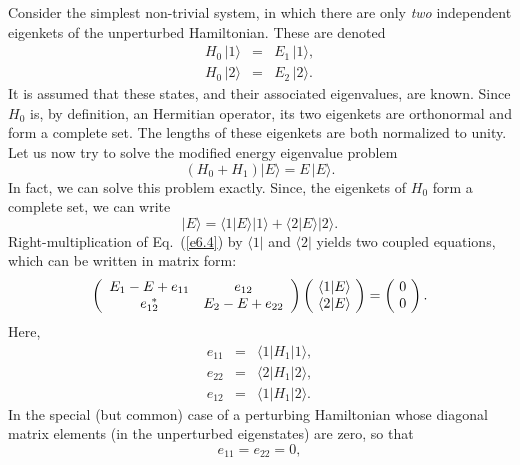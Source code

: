 Consider the simplest non-trivial system, in which there are only {\em two}
independent  eigenkets of the unperturbed Hamiltonian. These are denoted
\begin{eqnarray}
H_0 \,|1\rangle &=& E_1 \,|1\rangle,\\[0.5ex]
H_0 \,|2\rangle &=& E_2 \,|2\rangle.
\end{eqnarray}
It is assumed that these states, and their associated eigenvalues, are known.
Since $H_0$ is, by definition,  an Hermitian operator,
 its two eigenkets are orthonormal
and form a complete set. The lengths of these
eigenkets are both normalized to unity. 
Let us now try to solve the modified energy eigenvalue problem
\begin{equation}\label{e6.4}
(H_0 + H_1) |E\rangle = E\,|E\rangle.
\end{equation}
In fact, we can solve this problem exactly. Since, the eigenkets of $H_0$ form a
complete set, we can write
\begin{equation}
|E\rangle = \langle 1|E\rangle |1\rangle  + \langle 2|E\rangle |2\rangle.
\end{equation}
Right-multiplication of  Eq.~(\ref{e6.4}) by $\langle 1|$ and $\langle 2|$ yields two
coupled equations, which can be written in matrix form:
\begin{equation}\label{e6.6}
\left( \begin{array}{c c}
E_1 -E + e_{11}   & e_{12} \\
e_{12}^{~\ast} & E_2 -E + e_{22} 
\end{array} \right)\left(\!
\begin{array}{c}\langle 1|E\rangle\\
\langle 2|E \rangle\end{array}
\!\right)= \left(\!\begin{array}{c}0\\
0 \end{array}\!
\right).
\end{equation}
Here,
\begin{eqnarray}
e_{11} &=& \langle 1|H_1 | 1\rangle,\\[0.5ex]
e_{22} &=& \langle 2 |H_1 |2\rangle, \\[0.5ex]
e_{12} &=& \langle 1|H_1|2\rangle.
\end{eqnarray}
In the special (but common) case of a perturbing Hamiltonian whose diagonal
matrix elements (in the unperturbed eigenstates) are zero, so that
\begin{equation}
e_{11} = e_{22} = 0,
\end{equation}
